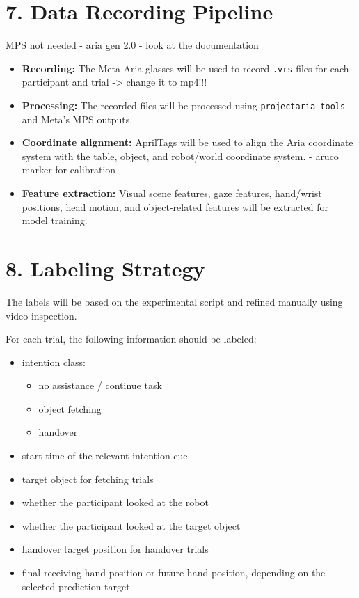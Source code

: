 \documentclass[11pt,a4paper]{article}
\begin{document}
\section*{7. Data Recording Pipeline}
MPS not needed - aria gen 2.0 - look at the documentation 
\begin{itemize}
    \item \textbf{Recording:} The Meta Aria glasses will be used to record \texttt{.vrs} files for each participant and trial -> change it to mp4!!!
    
    \item \textbf{Processing:} The recorded files will be processed using \texttt{projectaria\_tools} and Meta's MPS outputs.
    
    \item \textbf{Coordinate alignment:} AprilTags will be used to align the Aria coordinate system with the table, object, and robot/world coordinate system.
    - aruco marker for calibration
    
    \item \textbf{Feature extraction:} Visual scene features, gaze features, hand/wrist positions, head motion, and object-related features will be extracted for model training.
\end{itemize}

\section*{8. Labeling Strategy}

The labels will be based on the experimental script and refined manually using video inspection.

For each trial, the following information should be labeled:

\begin{itemize}
    \item intention class:
    \begin{itemize}
        \item no assistance / continue task
        \item object fetching
        \item handover
    \end{itemize}
    
    \item start time of the relevant intention cue
    
    \item target object for fetching trials
    
    \item whether the participant looked at the robot
    
    \item whether the participant looked at the target object
    
    \item handover target position for handover trials
    
    \item final receiving-hand position or future hand position, depending on the selected prediction target
\end{itemize}
\end{document}
